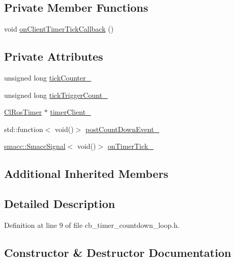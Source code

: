 \subsection*{Private Member Functions}
\begin{DoxyCompactItemize}
\item 
void \hyperlink{classcl__ros__timer_1_1CbTimerCountdownLoop_acb16f3448ad5955bf36e7c2cfd9f691c}{on\+Client\+Timer\+Tick\+Callback} ()
\end{DoxyCompactItemize}
\subsection*{Private Attributes}
\begin{DoxyCompactItemize}
\item 
unsigned long \hyperlink{classcl__ros__timer_1_1CbTimerCountdownLoop_a2b2d192bae0da3d26c6e3011583f9a6a}{tick\+Counter\+\_\+}
\item 
unsigned long \hyperlink{classcl__ros__timer_1_1CbTimerCountdownLoop_af377585c3d4499a4eec4668549181ae1}{tick\+Trigger\+Count\+\_\+}
\item 
\hyperlink{classcl__ros__timer_1_1ClRosTimer}{Cl\+Ros\+Timer} $\ast$ \hyperlink{classcl__ros__timer_1_1CbTimerCountdownLoop_acca81b8f1807f8e8faf692fb3f9e4dbd}{timer\+Client\+\_\+}
\item 
std\+::function$<$ void()$>$ \hyperlink{classcl__ros__timer_1_1CbTimerCountdownLoop_aafc2594c2923e4a355394ffb339d1800}{post\+Count\+Down\+Event\+\_\+}
\item 
\hyperlink{classsmacc_1_1SmaccSignal}{smacc\+::\+Smacc\+Signal}$<$ void()$>$ \hyperlink{classcl__ros__timer_1_1CbTimerCountdownLoop_a9df6547f8ddf45107d8850d8a1a92cf4}{on\+Timer\+Tick\+\_\+}
\end{DoxyCompactItemize}
\subsection*{Additional Inherited Members}


\subsection{Detailed Description}


Definition at line 9 of file cb\+\_\+timer\+\_\+countdown\+\_\+loop.\+h.



\subsection{Constructor \& Destructor Documentation}
\mbox{\label{classcl__ros__timer_1_1CbTimerCountdownLoop_a8cdfe250d9469ea019b61051be123195}} 

